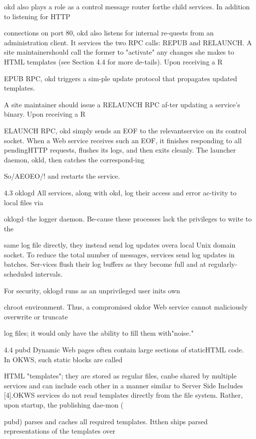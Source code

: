 okd also plays a role as a control message router forthe child services. In addition to listening for HTTP

connections on port 80, okd also listens for internal re-quests from an administration client. It services the two
RPC calls: REPUB and RELAUNCH. A site maintainershould call the former to "activate" any changes she
makes to HTML templates (see Section 4.4 for more de-tails). Upon receiving a R

EPUB RPC, okd triggers a sim-ple update protocol that propagates updated templates.

A site maintainer should issue a RELAUNCH RPC af-ter updating a service's binary. Upon receiving a R

ELAUNCH RPC, okd simply sends an EOF to the relevantservice on its control socket. When a Web service receives such an EOF, it finishes responding to all pendingHTTP requests, flushes its logs, and then exits cleanly.
The launcher daemon, okld, then catches the correspond-ing

So/AEOEO/! and restarts the service.

4.3 oklogd
All services, along with okd, log their access and error ac-tivity to local files via

oklogd--the logger daemon. Be-cause these processes lack the privileges to write to the

same log file directly, they instead send log updates overa local Unix domain socket. To reduce the total number
of messages, services send log updates in batches. Ser-vices flush their log buffers as they become full and at
regularly-scheduled intervals.

For security, oklogd runs as an unprivileged user inits own

chroot environment. Thus, a compromised okdor Web service cannot maliciously overwrite or truncate

log files; it would only have the ability to fill them with"noise."

4.4 pubd
Dynamic Web pages often contain large sections of staticHTML code. In OKWS, such static blocks are called

HTML "templates"; they are stored as regular files, canbe shared by multiple services and can include each other
in a manner similar to Server Side Includes [4].OKWS services do not read templates directly from
the file system. Rather, upon startup, the publishing dae-mon (

pubd) parses and caches all required templates. Itthen ships parsed representations of the templates over


